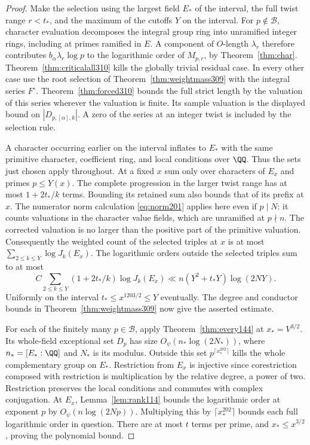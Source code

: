 \documentclass[a4paper,11pt]{article}
\theoremstyle{definition}
\theoremstyle{remark}
\numberwithin{equation}{section}
\begin{document}
\begin{proof}
Make the selection using the largest field \(E_*\) of the
interval, the full twist range \(r<t_*\), and the maximum of
the cutoffs \(Y\) on the interval. For \(p\notin\mathcal B\),
character evaluation decomposes the integral group ring into
unramified integer rings, including at primes ramified in \(E\).
A component of \(O\)-length \(\lambda_r\) therefore contributes
\(b_\alpha\lambda_r\log p\) to the logarithmic order of \(M_{p,r}\),
by Theorem~\ref{thm:char}. Theorem~\ref{thm:criticalall310} kills
the globally trivial residual case. In every other case use the
root selection of Theorem~\ref{thm:weightmass309} with the
integral series \(F^\circ\). Theorem~\ref{thm:forced310} bounds
the full strict length by the valuation of this series wherever
the valuation is finite. Its sample valuation is the displayed
bound on \(|D_{p,[\alpha],k}|\). A zero of the series at an
integer twist is included by the selection rule.

A character occurring earlier on the interval inflates to \(E_*\)
with the same primitive character, coefficient ring, and local
conditions over \(\QQ\). Thus the sets just chosen apply
throughout. At a fixed \(x\) sum only over characters of \(E_x\)
and primes \(p\le Y(x)\). The complete progression in the larger
twist range has at most \(1+2t_*/k\) terms. Bounding its retained
sum also bounds that of its prefix at \(x\). The numerator norm
calculation \eqref{eq:norm201} applies here even if \(p\mid N\):
it counts valuations in the character value fields, which are
unramified at \(p\nmid n\). The corrected valuation is no larger
than the positive part of the primitive valuation. Consequently
the weighted count of the selected triples at \(x\) is at most
\(\sum_{2\le k\le Y}\log J_k(E_x)\). The logarithmic orders
outside the selected triples sum to at most
\[
 C\sum_{2\le k\le Y}(1+2t_*/k)\log J_k(E_x)
       \ll n(Y^2+t_*Y)\log(2NY).
\]
Uniformly on the interval \(t_*\le x^{1203/2}\le Y\) eventually.
The degree and conductor bounds in
Theorem~\ref{thm:weightmass309} now give the asserted estimate.

For each of the finitely many \(p\in\mathcal B\), apply
Theorem~\ref{thm:every144} at \(x_*=V^{3/2}\). Its whole-field
exceptional set \(D_p\) has size \(O_\psi(n_*\log(2N_*))\),
where \(n_*=[E_*:\QQ]\) and \(N_*\) is its modulus. Outside
this set \(p^{\lceil x_*^{202}\rceil}\) kills the whole
complementary group on \(E_*\). Restriction from \(E_x\) is
injective since corestriction composed with restriction is
multiplication by the relative degree, a power of two.
Restriction preserves the local conditions and commutes with
complex conjugation. At \(E_x\), Lemma~\ref{lem:rank114} bounds
the logarithmic order at exponent \(p\) by \(O_\psi(n\log(2Np))\).
Multiplying this by \(\lceil x_*^{202}\rceil\) bounds each full
logarithmic order in question. There are at most \(t\) terms per
prime, and \(x_*\le x^{3/2}\), proving the polynomial bound.


\end{proof}
\end{document}
